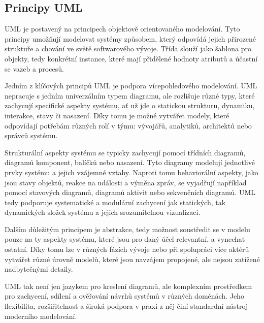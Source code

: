 
\subsection{Principy UML}
\label{sec:principy-uml}
UML je postavený na principech objektově orientovaného modelování. \cite{Rybola2017} Tyto principy umožňují modelovat systémy způsobem, který odpovídá jejich přirozené struktuře a chování ve světě softwarového vývoje. Třída slouží jako šablona pro objekty, tedy konkrétní instance, které mají přidělené hodnoty atributů a účastní se vazeb a procesů. \cite{Clark1997}

Jedním z klíčových principů UML je podpora vícepohledového modelování. UML nepracuje s jedním univerzálním typem diagramu, ale rozlišuje různé typy, které zachycují specifické aspekty systému, ať už jde o statickou strukturu, dynamiku, interakce, stavy či nasazení. Díky tomu je možné vytvářet modely, které odpovídají potřebám různých rolí v týmu: vývojářů, analytiků, architektů nebo správců systému. \cite{Broy2006,Filho2017}

Strukturální aspekty systému se typicky zachycují pomocí třídních diagramů, diagramů komponent, balíčků nebo nasazení. Tyto diagramy modelují jednotlivé prvky systému a jejich vzájemné vztahy. Naproti tomu behaviorální aspekty, jako jsou stavy objektů, reakce na události a výměna zpráv, se vyjadřují například pomocí stavových diagramů, diagramů aktivit nebo sekvenčních diagramů. UML tedy podporuje systematické a modulární zachycení jak statických, tak dynamických složek systému a jejich srozumitelnou vizualizaci. \cite{Broy2006}

Dalším důležitým principem je abstrakce, tedy možnost soustředit se v modelu pouze na ty aspekty systému, které jsou pro daný účel relevantní, a vynechat ostatní. Díky tomu lze v různých fázích vývoje nebo při spolupráci více aktérů vytvářet různé úrovně modelů, které jsou navzájem propojené, ale nejsou zatížené nadbytečnými detaily. \cite{Engels2000, Rumpe2016}

UML tak není jen jazykem pro kreslení diagramů, ale komplexním prostředkem pro zachycení, sdílení a ověřování návrhů systémů v různých doménách. Jeho flexibilita, rozšiřitelnost a široká podpora v praxi z něj činí standardní nástroj moderního modelování. \cite{Broy2006,Rumpe2016}


